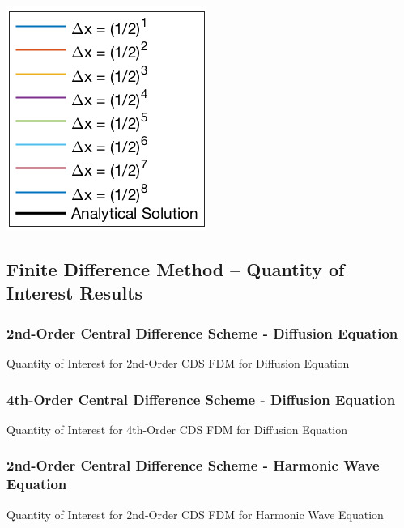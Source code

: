 \documentclass[10pt]{article}		%
\numberwithin{equation}{section}
\begin{document}
\begin{center}
	\includegraphics[height = 0.11\linewidth]{legend}
\end{center}

\newpage

\subsection{Finite Difference Method -- Quantity of Interest Results}

\subsubsection{2nd-Order Central Difference Scheme - Diffusion Equation}

\begin{table}[H]
	\caption{Quantity of Interest for 2nd-Order CDS FDM for Diffusion Equation}	
	
	
\end{table}

\newpage

\subsubsection{4th-Order Central Difference Scheme - Diffusion Equation}

\begin{table}[H]
	\caption{Quantity of Interest for 4th-Order CDS FDM for Diffusion Equation}	
	
	
\end{table}

\newpage

\subsubsection{2nd-Order Central Difference Scheme - Harmonic Wave Equation}

\begin{table}[H]
	\caption{Quantity of Interest for 2nd-Order CDS FDM for Harmonic Wave Equation}	
	
	
\end{table}

\newpage
\end{document}
